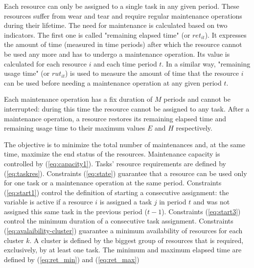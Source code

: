\documentclass{roadef}
\begin{document}
Each resource can only be assigned to a single task in any given period. These resources suffer from wear and tear and require regular maintenance operations during their lifetime. The need for maintenance is calculated based on two indicators. The first one is called "remaining elapsed time" (or $ret_{it}$). It expresses the amount of time (measured in time periods) after which the resource cannot be used any more and has to undergo a maintenance operation. Its value is calculated for each resource $i$ and each time period $t$. In a similar way, "remaining usage time" (or $rut_{it}$) is used to measure the amount of time that the resource $i$ can be used before needing a maintenance operation at any given period $t$.

Each maintenance operation has a fix duration of $M$ periods and cannot be interrupted: during this time the resource cannot be assigned to any task. After a maintenance operation, a resource restores its remaining elapsed time and remaining usage time to their maximum values $E$ and $H$ respectively.


The objective is to minimize the total number of maintenances and, at the same time, maximize the end status of the resources.     Maintenance capacity is controlled by (\ref{eq:capacity1}). Tasks' resource requirements are defined by (\ref{eq:taskres}). Constraints (\ref{eq:state}) guarantee that a resource can be used only for one task or a maintenance operation at the same period. Constraints (\ref{eq:start1}) control the definition of starting a consecutive assignment: the variable is active if a resource $i$ is assigned a task $j$ in period $t$ and was not assigned this same task in the previous period ($t-1$). Constraints (\ref{eq:start3}) control the minimum duration of a consecutive task assignment. Constraints (\ref{eq:avalaibility-cluster}) guarantee a minimum availability of resources for each cluster $k$. A cluster is defined by the biggest group of resources that is required, exclusively, by at least one task. The minimum and maximum elapsed time are defined by (\ref{eq:ret_min}) and (\ref{eq:ret_max})
\end{document}
